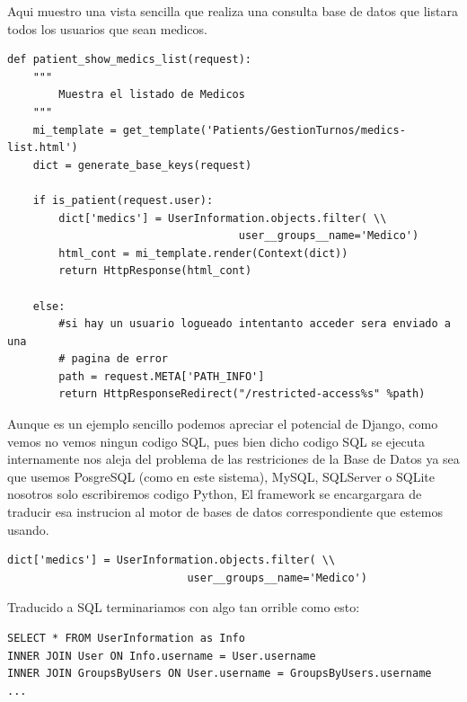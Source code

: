 Aqui muestro una vista sencilla que realiza una consulta base de datos que listara todos
los usuarios que sean medicos. \\[0.1cm]

\begin{lstlisting}[style=Python]
def patient_show_medics_list(request):
    """
        Muestra el listado de Medicos
    """
    mi_template = get_template('Patients/GestionTurnos/medics-list.html')
    dict = generate_base_keys(request)

    if is_patient(request.user):
        dict['medics'] = UserInformation.objects.filter( \\
                                    user__groups__name='Medico')
        html_cont = mi_template.render(Context(dict))
        return HttpResponse(html_cont)

    else:
        #si hay un usuario logueado intentanto acceder sera enviado a una
        # pagina de error
        path = request.META['PATH_INFO']
        return HttpResponseRedirect("/restricted-access%s" %path)
\end{lstlisting}

\vspace{0.1cm}

Aunque es un ejemplo sencillo podemos apreciar el potencial de Django, como vemos
no vemos ningun codigo SQL, pues bien dicho codigo SQL se ejecuta internamente
nos aleja del problema de las restriciones de la Base de Datos ya sea que usemos
PosgreSQL (como en este sistema), MySQL, SQLServer o SQLite nosotros
solo escribiremos codigo Python, El framework se encargargara de traducir esa
instrucion al motor de bases de datos correspondiente que estemos usando.\\[0.2cm]

\begin{lstlisting}[style=consola]
dict['medics'] = UserInformation.objects.filter( \\
                            user__groups__name='Medico')
\end{lstlisting}

\vspace{0.1cm}

Traducido a SQL terminariamos con algo tan orrible como esto:\\[0.1cm]

\begin{lstlisting}[style=consola]
SELECT * FROM UserInformation as Info
INNER JOIN User ON Info.username = User.username
INNER JOIN GroupsByUsers ON User.username = GroupsByUsers.username
...
\end{lstlisting}

